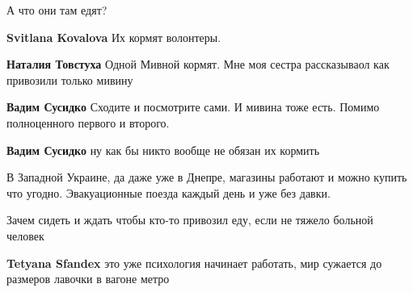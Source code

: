 \begin{itemize}
А что они там едят?

\begin{itemize} %
\textbf{Svitlana Kovalova} Их кормят волонтеры.

\textbf{Наталия Товстуха} Одной Мивной кормят. Мне моя сестра рассказываол как привозили только мивину

\textbf{Вадим Сусидко} Сходите и посмотрите сами. И мивина тоже есть. Помимо полноценного первого и второго.

\textbf{Вадим Сусидко} ну как бы никто вообще не обязан их кормить

В Западной Украине, да даже уже в Днепре, магазины работают и можно купить что
угодно. Эвакуационные поезда каждый день и уже без давки.

Зачем сидеть и ждать чтобы кто-то привозил еду, если не тяжело больной человек

\textbf{Tetyana Sfandex} это уже психология начинает работать, мир сужается до размеров лавочки в вагоне метро
\end{itemize} %


\end{itemize} %
